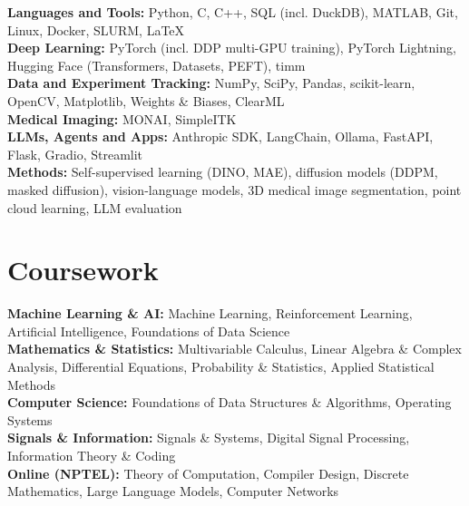\documentclass[letterpaper,11pt]{article}
\begin{document}
\textbf{Languages and Tools:} Python, C, C++, SQL (incl. DuckDB), MATLAB, Git, Linux, Docker, SLURM, \LaTeX \\
\textbf{Deep Learning:} PyTorch (incl. DDP multi-GPU training), PyTorch Lightning, Hugging Face (Transformers, Datasets, PEFT), timm \\
\textbf{Data and Experiment Tracking:} NumPy, SciPy, Pandas, scikit-learn, OpenCV, Matplotlib, Weights \& Biases, ClearML \\
\textbf{Medical Imaging:} MONAI, SimpleITK \\
\textbf{LLMs, Agents and Apps:} Anthropic SDK, LangChain, Ollama, FastAPI, Flask, Gradio, Streamlit \\
\textbf{Methods:} Self-supervised learning (DINO, MAE), diffusion models (DDPM, masked diffusion), vision-language models, 3D medical image segmentation, point cloud learning, LLM evaluation \\
\vspace{-1.5em}

\section{Coursework}
\vspace{-0.2em}
\textbf{Machine Learning \& AI:} Machine Learning, Reinforcement Learning, Artificial Intelligence, Foundations of Data Science \\
\textbf{Mathematics \& Statistics:} Multivariable Calculus, Linear Algebra \& Complex Analysis, Differential Equations, Probability \& Statistics, Applied Statistical Methods \\
\textbf{Computer Science:} Foundations of Data Structures \& Algorithms, Operating Systems \\
\textbf{Signals \& Information:} Signals \& Systems, Digital Signal Processing, Information Theory \& Coding \\
\textbf{Online (NPTEL):} Theory of Computation, Compiler Design, Discrete Mathematics, Large Language Models, Computer Networks \\
\vspace{-1.4em}
    

\end{document}
